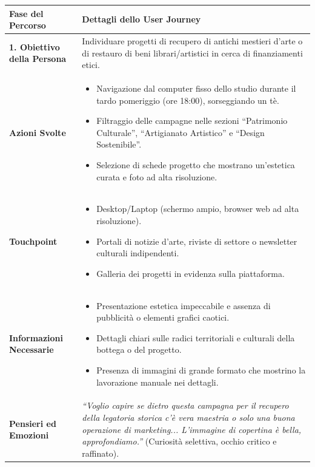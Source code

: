 \documentclass[11pt,a4paper]{article}
\begin{document}
\begin{table}[h!]
\centering
\small
\begin{tabular}{|p{3.2cm}|p{11.8cm}|}
\hline
\textbf{Fase del Percorso} & \textbf{Dettagli dello User Journey} \\ \hline
\hline
\textbf{1. Obiettivo della Persona} & Individuare progetti di recupero di antichi mestieri d'arte o di restauro di beni librari/artistici in cerca di finanziamenti etici. \\ \hline
\textbf{Azioni Svolte} &
\begin{itemize}[leftmargin=*,nosep]
    \item Navigazione dal computer fisso dello studio durante il tardo pomeriggio (ore 18:00), sorseggiando un tè.
    \item Filtraggio delle campagne nelle sezioni ``Patrimonio Culturale'', ``Artigianato Artistico'' e ``Design Sostenibile''.
    \item Selezione di schede progetto che mostrano un'estetica curata e foto ad alta risoluzione.
\end{itemize} \\ \hline
\textbf{Touchpoint} &
\begin{itemize}[leftmargin=*,nosep]
    \item Desktop/Laptop (schermo ampio, browser web ad alta risoluzione).
    \item Portali di notizie d'arte, riviste di settore o newsletter culturali indipendenti.
    \item Galleria dei progetti in evidenza sulla piattaforma.
\end{itemize} \\ \hline
\textbf{Informazioni Necessarie} &
\begin{itemize}[leftmargin=*,nosep]
    \item Presentazione estetica impeccabile e assenza di pubblicità o elementi grafici caotici.
    \item Dettagli chiari sulle radici territoriali e culturali della bottega o del progetto.
    \item Presenza di immagini di grande formato che mostrino la lavorazione manuale nei dettagli.
\end{itemize} \\ \hline
\textbf{Pensieri ed Emozioni} &
\textit{``Voglio capire se dietro questa campagna per il recupero della legatoria storica c'è vera maestria o solo una buona operazione di marketing... L'immagine di copertina è bella, approfondiamo.''} (Curiosità selettiva, occhio critico e raffinato). \\ \hline

\end{tabular}
\end{table}
\end{document}
